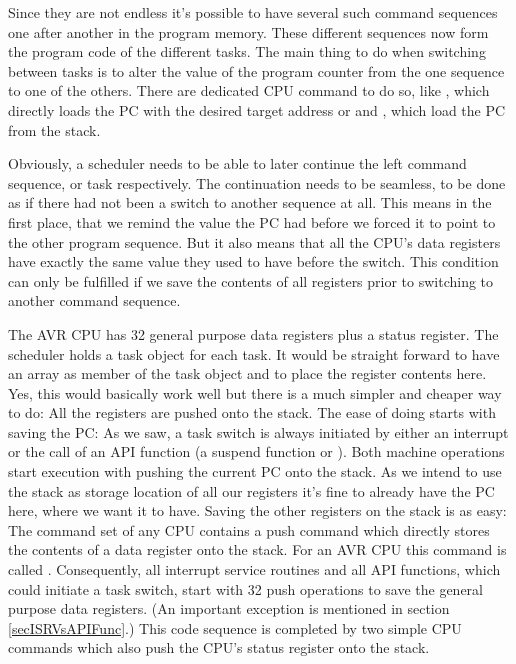 Since they are not endless it's possible to have several such command
sequences one after another in the program memory. These different
sequences now form the program code of the different tasks. The main thing
to do when switching between tasks is to alter the value of the program
counter from the one sequence to one of the others. There are dedicated
CPU command to do so, like , which directly loads the PC with
the desired target address or  and , which load the
PC from the stack.

Obviously, a scheduler needs to be able to later continue the left command
sequence, or task respectively. The continuation needs to be seamless, to
be done as if there had not been a switch to another sequence at all. This
means in the first place, that we remind the value the PC had before we
forced it to point to the other program sequence. But it also means that
all the CPU's data registers have exactly the same value they used to have
before the switch. This condition can only be fulfilled if we save the
contents of all registers prior to switching to another command sequence.

The AVR CPU has 32 general purpose data registers plus a status register.
The scheduler holds a task object for each task. It would be straight
forward to have an array  as member of the
task object and to place the register contents here. Yes, this would
basically work well but there is a much simpler and cheaper way to do: All
the registers are pushed onto the stack. The ease of doing starts with
saving the PC: As we saw, a task switch is always initiated by either an
interrupt or the call of an API function (a suspend function or
). Both machine operations start execution with
pushing the current PC onto the stack. As we intend to use the stack as
storage location of all our registers it's fine to already have the PC
here, where we want it to have. Saving the other registers on the stack is
as easy: The command set of any CPU contains a push command which directly
stores the contents of a data register onto the stack. For an AVR CPU this
command is called . Consequently, all interrupt service
routines and all API functions, which could initiate a task switch, start
with 32 push operations to save the general purpose data registers. (An
important exception is mentioned in section \ref{secISRVsAPIFunc}.) This
code sequence is completed by two simple CPU commands which also push the
CPU's status register onto the stack.

